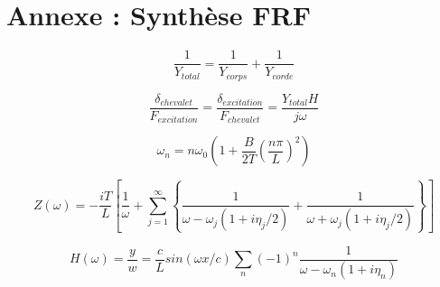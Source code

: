 \newpage
\section*{Annexe : Synthèse FRF}

\begin{equation}
  \frac{1}{Y_{total}} = \frac{1}{Y_{corps}} + \frac{1}{Y_{corde}}
  \label{eq:eq_frf_1}
\end{equation}

\begin{equation}
  \frac{\delta_{chevalet}}{F_{excitation}} = \frac{\delta_{excitation}}{F_{chevalet}} = \frac{Y_{total}H}{j\omega}
  \label{eq:eq_frf_2}
\end{equation}

\begin{equation}
	\omega_n = n\omega_0\left(1+\frac{B}{2T}(\frac{n\pi}{L})^2\right)
 \label{eq:eq_frf_3}
\end{equation}


\begin{equation}
 Z(\omega) = -\frac{iT}{L} \left[ \frac{1}{\omega} + \sum_{j=1}^{\infty} \left\lbrace \frac{1}{\omega - \omega_j (1+ i\eta_j/2)} + \frac{1}{\omega + \omega_j (1+ i\eta_j/2)} \right\rbrace  \right]
  \label{eq:eq_frf_4}
\end{equation}

\begin{equation}
H(\omega) = \frac{y}{w} = \frac{c}{L} sin(\omega x/c )\sum_n (-1)^n \frac{1}{\omega - \omega_n(1 + i\eta_n)}
  \label{eq:eq_frf_5}
\end{equation}


